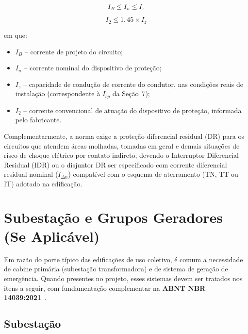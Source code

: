 \documentclass[12pt,openright,oneside,a4paper,brazil]{abntex2}
\newcommand{\norma}[1]{\textbf{#1}}
\begin{document}
\begin{equation}
    I_B \le I_n \le I_z
    \label{eq:condicao_protecao_1}
\end{equation}

\begin{equation}
    I_2 \le 1{,}45 \times I_z
    \label{eq:condicao_protecao_2}
\end{equation}

em que:

\begin{itemize}[leftmargin=1.2cm]
    \item $I_B$ -- corrente de projeto do circuito;
    \item $I_n$ -- corrente nominal do dispositivo de proteção;
    \item $I_z$ -- capacidade de condução de corrente do condutor, nas
    condições reais de instalação (correspondente à $I_{cp}$ da Seção~7);
    \item $I_2$ -- corrente convencional de atuação do dispositivo de
    proteção, informada pelo fabricante.
\end{itemize}

Complementarmente, a norma exige a proteção diferencial residual (DR) para
os circuitos que atendem áreas molhadas, tomadas em geral e demais
situações de risco de choque elétrico por contato indireto, devendo o
Interruptor Diferencial Residual (IDR) ou o disjuntor DR ser especificado
com corrente diferencial residual nominal ($I_{\Delta n}$) compatível com o
esquema de aterramento (TN, TT ou IT) adotado na edificação.

\section{Subestação e Grupos Geradores (Se Aplicável)}

\hspace{1.27cm}Em razão do porte típico das edificações de uso coletivo, é comum a
necessidade de cabine primária (subestação transformadora) e de sistema de
geração de emergência. Quando presentes no projeto, esses sistemas devem
ser tratados nos itens a seguir, com fundamentação complementar na
\norma{ABNT NBR 14039:2021}~\cite{nbr14039}.

\subsection{Subestação}
\end{document}
